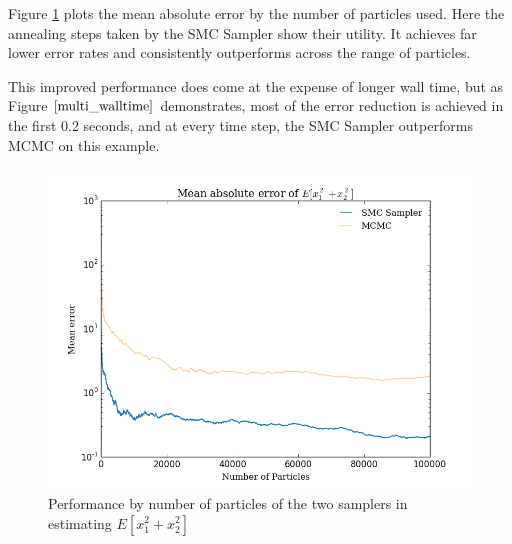 \documentclass[12pt]{elsarticle}
\begin{document}
Figure \ref{multi_particles} plots the mean absolute error by the number of particles used. Here the annealing steps taken by the SMC Sampler show their utility. It achieves far lower error rates and consistently outperforms across the range of particles.

This improved performance does come at the expense of longer wall time, but as Figure $\ref{multi_walltime}$ demonstrates, most of the error reduction is achieved in the first 0.2 seconds, and at every time step, the SMC Sampler outperforms MCMC on this example.

\begin{figure}[htbp]
\begin{center}
\includegraphics[width = \textwidth]{plots/2d-errors.png}
\caption{Performance by number of particles of the two samplers in estimating $E[x_1^2 + x_2^2]$}
\label{multi_particles}
\end{center}
\end{figure}
\end{document}

